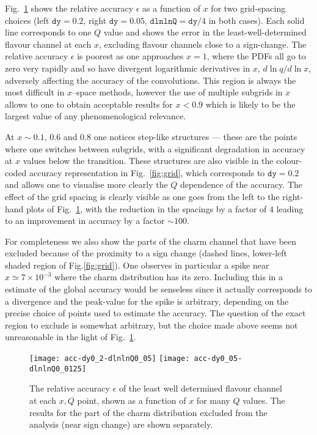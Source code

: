 \documentclass[12pt]{article}
\newcommand{\dy}{\ttt{dy}}
\newcommand{\dlnlnQ}{\ttt{dlnlnQ}}
\newcommand{\ttt}[1]{\texttt{#1}}
\begin{document}
Fig.~\ref{fig:acc-fixed-dy-dlnlnQ} shows the relative accuracy
$\epsilon$ as a function of $x$ for two grid-spacing choices (left
$\dy=0.2$, right $\dy=0.05$, $\dlnlnQ=\dy/4$ in both cases). Each
solid line corresponds to one $Q$ value and shows the error in the
least-well-determined flavour channel at each $x$, excluding flavour
channels close to a sign-change. The relative accuracy $\epsilon$
is poorest as
one approaches $x=1$, where the PDFs all go to zero very rapidly and
so have divergent logarithmic derivatives in $x$, $d\ln q/d\ln x$,
adversely affecting the accuracy of the convolutions. This region is
always the most difficult in $x$--space methods, however the use of
multiple subgrids in $x$ allows to one to obtain acceptable results
for $x<0.9$ which is likely to be the largest value of any
phenomenological relevance. 

At $x\sim0.1$, $0.6$ and $0.8$ one notices
step-like structures --- these are the points where one switches
between subgrids, with a significant degradation in accuracy at $x$
values below the transition. These structures are also visible in the
colour-coded accuracy representation in Fig.~\ref{fig:grid}, which
corresponds to $\dy=0.2$ and allows one to visualise more clearly the
$Q$ dependence of the accuracy. The effect of the grid spacing is
clearly visible as one goes from the left to the right-hand plots of
Fig.~\ref{fig:acc-fixed-dy-dlnlnQ},
with the reduction in the spacings by a factor of $4$ leading to an
improvement in accuracy by a factor $\sim 100$.



For completeness we also show the parts of the charm channel that have
been excluded because of the proximity to a sign change (dashed lines,
lower-left shaded region of Fig.\ref{fig:grid}).  One observes in
particular a spike near $x\simeq 7 \times 10^{-3}$ where the charm
distribution has its zero. Including this in a estimate of the global
accuracy would be senseless since it actually corresponds to a
divergence and the peak-value for the spike is arbitrary, depending on
the precise choice of points used to estimate the accuracy. The
question of the exact region to exclude is somewhat arbitrary, but the
choice made above seems not unreasonable in the light of
Fig.~\ref{fig:acc-fixed-dy-dlnlnQ}.

\begin{figure}
  \centering
  \texttt{[image: acc-dy0\_2-dlnlnQ0\_05]}\hfill
  \texttt{[image: acc-dy0\_05-dlnlnQ0\_0125]}
  \caption{The relative accuracy $\epsilon$ of the least well
    determined flavour channel at each $x, Q$ point, shown as a
    function of $x$ for many $Q$ values. The results for the part of
    the charm distribution excluded from the analysis (near sign
    change) are shown separately. }
  \label{fig:acc-fixed-dy-dlnlnQ}
\end{figure}
\end{document}
